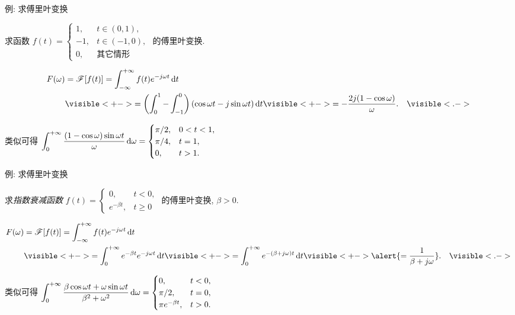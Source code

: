 \begin{frame}{例: 求傅里叶变换}
	\onslide<+->
	\begin{example}
		求函数 $f(t)=
			\begin{cases}
				1,&t\in(0,1),\\
				-1,&t\in(-1,0),\\
				0,&\text{其它情形}
			\end{cases}$
		的傅里叶变换.
	\end{example}

	\onslide<+->
	\begin{solution}
		\vspace{-\baselineskip}
		\begin{align*}
			F(\omega)&=\msf[f(t)]=\int_{-\infty}^{+\infty}f(t)e^{-j\omega t}\diff t\\
			&\visible<+->{=\left(\int_0^1-\int_{-1}^0\right)(\cos\omega t-j\sin\omega t)\diff t}
			\visible<+->{=-\frac{2j(1-\cos\omega)}\omega.}&\visible<.->{}
		\end{align*}
	\end{solution}

	\onslide<+->
	类似可得
	$\displaystyle\int_0^{+\infty}\frac{(1-\cos\omega)\sin\omega t}\omega\,\mathrm{d}\omega=
		\begin{cases}
			\pi/2,&0<t<1,\\
			\pi/4,&t=1,\\
			0,&t>1.
		\end{cases}$
\end{frame}


\begin{frame}{例: 求傅里叶变换}
	\onslide<+->
	\begin{example}
		求\emph{指数衰减函数} $f(t)=
			\begin{cases}
				0,&t<0,\\
				e^{-\beta t},&t\ge 0
			\end{cases}$ 的傅里叶变换, $\beta>0$.
	\end{example}

	\onslide<+->
	\begin{solution}
		\vspace{-\baselineskip}
		\begin{align*}
			F(\omega)&=\msf[f(t)]=\int_{-\infty}^{+\infty}f(t)e^{-j\omega t}\diff t\\
			&\visible<+->{=\int_0^{+\infty}e^{-\beta t}e^{-j\omega t}\diff t}
			\visible<+->{=\int_0^{+\infty}e^{-(\beta+j\omega)t}\diff t}
			\visible<+->{\alert{=\frac1{\beta+j\omega}}.}&\visible<.->{}
		\end{align*}
	\end{solution}

	\onslide<+->
	类似可得
	$\displaystyle\int_0^{+\infty}\frac{\beta\cos\omega t+\omega\sin\omega t}{\beta^2+\omega^2}\,\mathrm{d}\omega=
		\begin{cases}
			0,&t<0,\\
			\pi/2,&t=0,\\
			\pi e^{-\beta t},&t>0.
		\end{cases}$
\end{frame}



